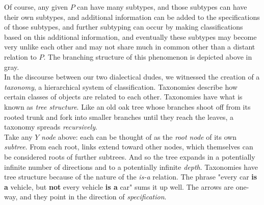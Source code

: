 Of course, any given $P$ can have many subtypes, and those subtypes can have their own subtypes, and additional information can be added to the specifications of those subtypes, and further subtyping can occur by making classifications based on this additional information, and eventually these subtypes may become very unlike each other and may not share much in common other than a distant relation to $P$. The branching structure of this phenomenon is depicted above in gray. \\

In the discourse between our two dialectical dudes, we witnessed the creation of a \textit{taxonomy}, a hierarchical system of classification. Taxonomies describe how certain classes of objects are related to each other. Taxonomies have what is known as \textit{tree structure}. Like an old oak tree whose branches shoot off from its rooted trunk and fork into smaller branches until they reach the leaves, a taxonomy spreads \textit{recursively}. \\

Take any $Y$ \textit{node} above: each can be thought of as the \textit{root node} of its own \textit{subtree}. From each root, links extend toward other nodes, which themselves can be considered roots of further subtrees. And so the tree expands in a potentially infinite number of directions and to a potentially infinite \textit{depth}. Taxonomies have tree structure because of the nature of the \textit{is-a} relation. The phrase "every car \textbf{is a} vehicle, but \textbf{not} every vehicle \textbf{is a} car" sums it up well. The arrows are one-way, and they point in the direction of \textit{specification}. \\\\


